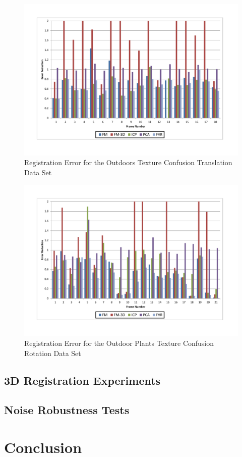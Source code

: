 \begin{figure}[t]
\centering
\includegraphics[width=6.0in]{images/results/Outside_TextureConfusion_Translation}
\caption{Registration Error for the Outdoors Texture Confusion Translation Data Set}
\label{fig:PET16}
\end{figure}

\begin{figure}[t]
\centering
\includegraphics[width=6.0in]{images/results/Plants_Outdoors_Texture_Confusion_Rotation}
\caption{Registration Error for the Outdoor Plants Texture Confusion Rotation Data Set}
\label{fig:PET17}
\end{figure}



\subsection{3D Registration Experiments}

\subsection{Noise Robustness Tests}



\section{Conclusion}
